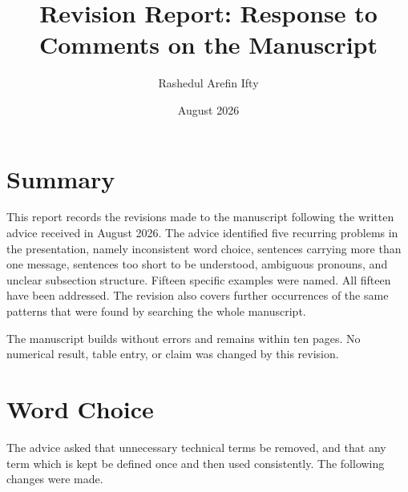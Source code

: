 \documentclass[11pt,a4paper]{article}
\title{Revision Report: Response to Comments on the Manuscript}
\author{Rashedul Arefin Ifty}
\date{August 2026}
\begin{document}
\maketitle

\section{Summary}
This report records the revisions made to the manuscript following the written
advice received in August 2026. The advice identified five recurring problems in
the presentation, namely inconsistent word choice, sentences carrying more than
one message, sentences too short to be understood, ambiguous pronouns, and
unclear subsection structure. Fifteen specific examples were named. All fifteen
have been addressed. The revision also covers further occurrences of the same
patterns that were found by searching the whole manuscript.

The manuscript builds without errors and remains within ten pages. No numerical
result, table entry, or claim was changed by this revision.

\section{Word Choice}
The advice asked that unnecessary technical terms be removed, and that any term
which is kept be defined once and then used consistently. The following changes
were made.
\end{document}
